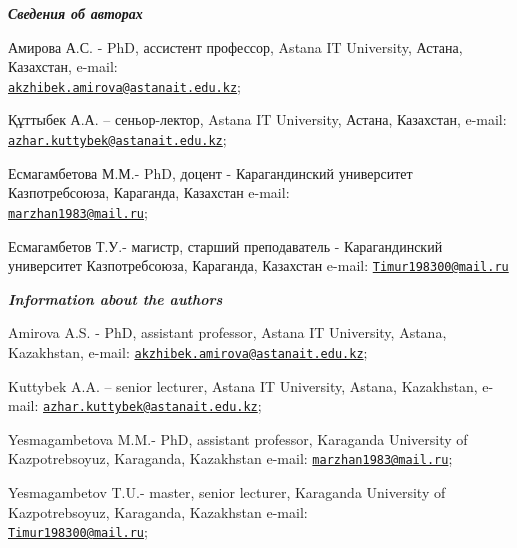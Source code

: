 \begin{authorinfo}
\emph{{\bfseries Сведения об авторах}}

Амирова А.С. - PhD, ассистент профессор, Astana IT University, Астана,
Казахстан, e-mail:\\
\href{mailto:akzhibek.amirova@astanait.edu.kz}{\nolinkurl{akzhibek.amirova@astanait.edu.kz}};

Құттыбек А.А. -- сеньор-лектор, Astana IT University, Астана, Казахстан,
e-mail:
\href{mailto:azhar.kuttybek@astanait.edu.kz}{\nolinkurl{azhar.kuttybek@astanait.edu.kz}};

Есмагамбетова М.М.- PhD, доцент - Карагандинский университет
Казпотребсоюза, Караганда, Казахстан e-mail:\\
\href{mailto:marzhan1983@mail.ru}{\nolinkurl{marzhan1983@mail.ru}};

Есмагамбетов Т.У.- магистр, старший преподаватель - Карагандинский
университет Казпотребсоюза, Караганда, Казахстан e-mail:
\href{mailto:Timur198300@mail.ru}{\nolinkurl{Timur198300@mail.ru}}

\emph{{\bfseries Information about the authors}}

Amirova A.S. - PhD, assistant professor, Astana IT University, Astana,
Kazakhstan, e-mail:
\href{mailto:akzhibek.amirova@astanait.edu.kz}{\nolinkurl{akzhibek.amirova@astanait.edu.kz}};

Kuttybek A.A. -- senior lecturer, Astana IT University, Astana,
Kazakhstan, e-mail:
\href{mailto:azhar.kuttybek@astanait.edu.kz}{\nolinkurl{azhar.kuttybek@astanait.edu.kz}};

Yesmagambetova M.M.- PhD, assistant professor, Karaganda University of
Kazpotrebsoyuz, Karaganda, Kazakhstan e-mail:
\href{mailto:marzhan1983@mail.ru}{\nolinkurl{marzhan1983@mail.ru}};

Yesmagambetov T.U.- master, senior lecturer, Karaganda University of
Kazpotrebsoyuz, Karaganda, Kazakhstan e-mail:\\
\href{mailto:Timur198300@mail.ru}{\nolinkurl{Timur198300@mail.ru}};
\end{authorinfo}
